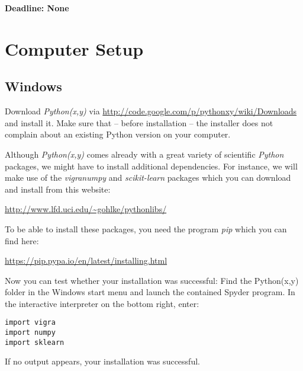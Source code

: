\documentclass{../uebungsblatt}
\begin{document}
\lstset{
    style=customc
}
\renewenvironment{leftbar}[1][\hsize]
{%
    \def\FrameCommand
    {%
        {\color{red}\vrule width 3pt}%
        \hspace{10pt}%
        \fboxsep=\FrameSep%
    }%
    \MakeFramed{\hsize#1\advance\hsize-\width\FrameRestore}%
}
{\endMakeFramed}

\begin{framed}
\textbf{Deadline: None}
\end{framed}

\section*{Computer Setup}
\subsection*{Windows}
Download \emph{Python(x,y)} via \url{http://code.google.com/p/pythonxy/wiki/Downloads}
and install it. Make sure that -- before installation -- the installer does not complain about an existing Python version on your computer.

Although \emph{Python(x,y)} comes already with a great variety of scientific \emph{Python} packages, we might have to install additional dependencies. For instance, we will make use of the \emph{vigranumpy} and \emph{scikit-learn}
packages which you can download and install from this website:

\url{http://www.lfd.uci.edu/~gohlke/pythonlibs/}

To be able to install these packages, you need the program \emph{pip} which you can find here:

\url{https://pip.pypa.io/en/latest/installing.html}

Now you can test whether your installation was successful: Find the Python(x,y) folder in the Windows start menu and launch the contained Spyder program. In the interactive interpreter on the bottom right, enter:
\begin{lstlisting}
import vigra
import numpy
import sklearn
\end{lstlisting}
If no output appears, your installation was successful.
\end{document}
